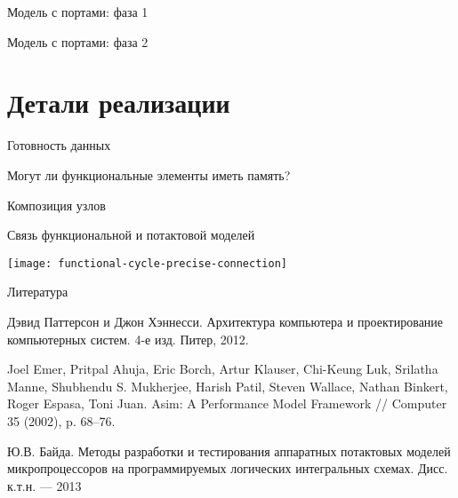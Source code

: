 \begin{frame}{Модель с портами: фаза 1}

\centering
{}

\end{frame}

\begin{frame}{Модель с портами: фаза 2}

\centering
{}

\end{frame}


\section{Детали реализации}

\begin{frame}{Готовность данных}

\centering
{}

\end{frame}

\begin{frame}{Могут ли функциональные элементы иметь память?}

\centering
{}

\end{frame}

\begin{frame}{Композиция узлов}

\centering
{}

\end{frame}

\begin{frame}{Связь функциональной и потактовой моделей}

\centering\texttt{[image: functional-cycle-precise-connection]}

\end{frame}

% 


\begin{frame}[allowframebreaks]{Литература}
\begin{thebibliography}{99}
     Дэвид Паттерсон и Джон Хэннесси. Архитектура компьютера и проектирование компьютерных
систем. 4-е изд. Питер, 2012.

 Joel Emer, Pritpal Ahuja, Eric Borch, Artur Klauser, Chi-Keung Luk, Srilatha Manne, Shubhendu S. Mukherjee,
Harish Patil, Steven Wallace, Nathan Binkert, Roger Espasa, Toni Juan. Asim: A Performance Model Framework // Computer 35 (2002), p. 68–76.

 Ю.В. Байда. Методы разработки и тестирования аппаратных потактовых моделей микропроцессоров на программируемых логических интегральных схемах. Дисс. к.т.н. — 2013
\end{thebibliography}
\end{frame}

